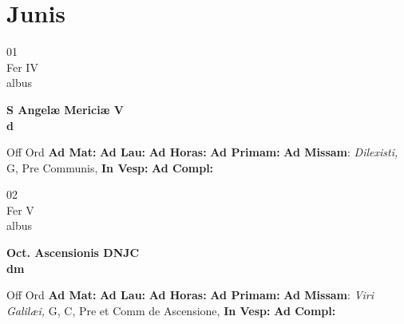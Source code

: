\documentclass[10pt, openany]{book}
\begin{document}
    \chapter{Junis}
                    
    \begin{center}
        \begin{minipage}{3.5in}
            \vspace{2em}
            \begin{minipage}{0.5in}
                {\Huge 01} \\
                {\normalsize Fer IV} \\
                {\normalsize albus}
            \end{minipage}
            \begin{minipage}{3.0in}
                \textbf{ \large S Angelæ Mericiæ V \\
                \textnormal{\normalsize d}} \\ 
            \end{minipage}
            \begin{justify}Off Ord
                \textbf{Ad Mat: }
                \textbf{Ad Lau: }
                \textbf{Ad Horas: }
                \textbf{Ad Primam: }\textbf{Ad Missam}: \textit{Dilexisti,} G, Pre Communis,  
                \textbf{In Vesp: }
                \textbf{Ad Compl: }
            \end{justify}
        \end{minipage}
    \end{center}

    \begin{center}
        \begin{minipage}{3.5in}
            \vspace{2em}
            \begin{minipage}{0.5in}
                {\Huge 02} \\
                {\normalsize Fer V} \\
                {\normalsize albus}
            \end{minipage}
            \begin{minipage}{3.0in}
                \textbf{ \large Oct. Ascensionis DNJC \\
                \textnormal{\normalsize dm}} \\ 
            \end{minipage}
            \begin{justify}Off Ord
                \textbf{Ad Mat: }
                \textbf{Ad Lau: }
                \textbf{Ad Horas: }
                \textbf{Ad Primam: }\textbf{Ad Missam}: \textit{Viri Galilæi,} G, C, Pre et Comm de Ascensione,  
                \textbf{In Vesp: }
                \textbf{Ad Compl: }
            \end{justify}
        \end{minipage}
    \end{center}
\end{document}
